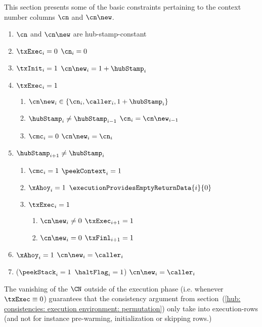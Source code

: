 This section presents some of the basic constraints pertaining to the context number columns $\cn$ and $\cn\new$.
\begin{enumerate}
	\item $\cn$ and $\cn\new$ are hub-stamp-constant
	\item \If $\txExec_{i} = 0$ \Then $\cn _{i} = 0$
	\item \If $\txInit_{i} = 1$ \Then $\cn\new _{i} = 1 + \hubStamp_{i}$
	\item \If $\txExec_{i} = 1$ \Then 
		\begin{enumerate}
			\item\label{next context number}
				$\cn\new_{i} \in \{ \cn_{i}, \caller_{i}, 1 + \hubStamp_{i} \}$
			\item \If $\hubStamp_{i} \neq \hubStamp_{i - 1}$ \Then $\cn_{i} = \cn\new_{i - 1}$
			\item \If $\cmc_{i} = 0$ \Then $\cn\new_{i} = \cn_{i}$
		\end{enumerate}
	\item \If $\hubStamp_{i + 1} \neq \hubStamp_{i}$ \Then
		\begin{enumerate}
			\item \label{hub: generalities: context: whenever the context may change the final row is a context row}
				\If $\cmc_{i}    = 1$ \Then $\peekContext_{i} = 1$
			\item \label{hub: generalities: context: exceptions lead to providing empty return data}
				\If $\xAhoy_{i}  = 1$ \Then $\executionProvidesEmptyReturnData {i}{0} $
			\item \label{hub: generalities: context: how to trigger finalization phase} \If $\txExec_{i} = 1$
				\begin{enumerate}
				        \item \If $\cn\new_{i} \neq 0$ \Then $\txExec_{i + 1} = 1$
				        \item \If $\cn\new_{i} =    0$ \Then $\txFinl_{i + 1} = 1$
				\end{enumerate}
		\end{enumerate}
	\item \If $\xAhoy_{i} = 1$ \Then $\cn\new_{i} = \caller_{i}$
	\item \If \big($\peekStack_{i} = 1$ \et $\haltFlag_{i} = 1$\big) \Then $\cn\new_{i} = \caller_{i}$
\end{enumerate}
\saNote{} \label{hub: generalities: context: vanishing of context number outside of the execution phase}
The vanishing of the $\CN$ outside of the execution phase (i.e. whenever $\txExec \equiv 0$)
guarantees that the consistency argument from section~(\ref{hub: consistencies: execution environment: permutation})
only take into execution-rows (and not for instance pre-warming, initialization or skipping rows.)

